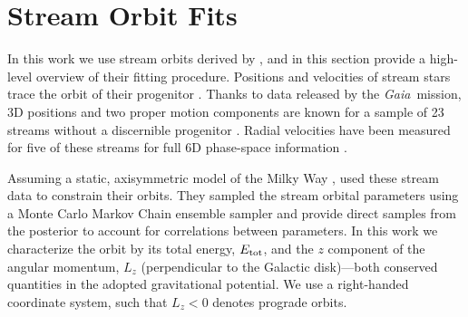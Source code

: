 \documentclass[twocolumn]{aastex63}
\newcommand{\gaia}{\textsl{Gaia}}
\begin{document}
% 

\section{Stream Orbit Fits}
In this work we use stream orbits derived by \citet{bk2021}, and in this section provide a high-level overview of their fitting procedure.
Positions and velocities of stream stars trace the orbit of their progenitor \citep[e.g.,][]{kuepper2010}.
Thanks to data released by the \gaia\ mission, 3D positions and two proper motion components are known for a sample of 23 streams without a discernible progenitor \citep{ibata2019, shipp2019, riley2020}.
Radial velocities have been measured for five of these streams for full 6D phase-space information \citep{caldwell2020, li2020, bonaca2020b}.

Assuming a static, axisymmetric model of the Milky Way \citep[default \texttt{MilkyWayPotential}]{gala}, \citet{bk2021} used these stream data to constrain their orbits.
They sampled the stream orbital parameters using a Monte Carlo Markov Chain ensemble sampler and provide direct samples from the posterior to account for correlations between parameters.
In this work we characterize the orbit by its total energy, $E_{\rm tot}$, and the $z$ component of the angular momentum, $L_z$ (perpendicular to the Galactic disk)---both conserved quantities in the adopted gravitational potential.
We use a right-handed coordinate system, such that $L_z<0$ denotes prograde orbits.
\end{document}
